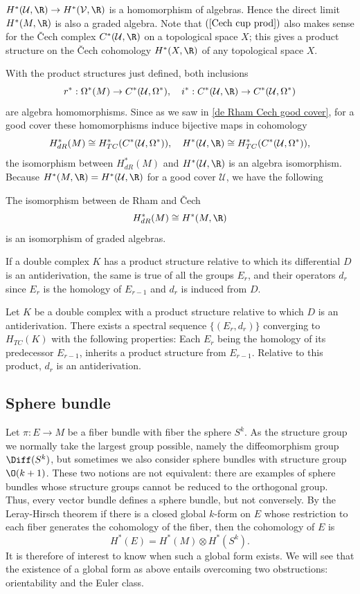 $H^*(\mathcal{U},\R)\to H^*(\mathcal{V},\R)$ is a homomorphism of algebras. Hence the direct limit $H^*(M,\R)$ is also a graded algebra. Note that $(\ref{Cech cup prod})$ 
also makes sense for the \v{C}ech complex $C^*(\mathcal{U},\R)$ on a topological space $X$; this gives a product structure on the \v{C}ech cohomology $H^*(X,\R)$ of any 
topological space $X$.\par
With the product structures just defined, both inclusions
\[r^*:\Omega^*(M)\to C^*(\mathcal{U},\Omega^*),\quad i^*:C^*(\mathcal{U},\R)\to C^*(\mathcal{U},\Omega^*)\]
are algebra homomorphisms. Since as we saw in \cref{de Rham Cech good cover}, for a good cover these homomorphisms induce bijective maps in cohomology
\[H^*_{dR}(M)\cong H^*_{TC}(C^*(\mathcal{U},\Omega^*)),\quad H^*(\mathcal{U},\R)\cong H^*_{TC}(C^*(\mathcal{U},\Omega^*)),\]
the isomorphism between $H^*_{dR}(M)$ and $H^*(\mathcal{U},\R)$ is an algebra isomorphism. Because $H^*(M,\R)=H^*(\mathcal{U},\R)$ for a good cover $\mathcal{U}$, we 
have the following
\begin{theorem}
The isomorphism between de Rham and \v{C}ech
\[H^*_{dR}(M)\cong H^*(M,\R)\]
is an isomorphism of graded algebras.
\end{theorem}
If a double complex $K$ has a product structure relative to which its differential $D$ is an antiderivation, the same is true of all the groups $E_r$, and their 
operators $d_r$ since $E_r$ is the homology of $E_{r-1}$ and $d_r$ is induced from $D$.
\begin{proposition}
Let $K$ be a double complex with a product structure relative to which $D$ is an antiderivation. There exists a spectral sequence $\{(E_r,d_r)\}$ converging to $H_{TC}(K)$ 
with the following properties: Each $E_r$ being the homology of its predecessor $E_{r-1}$, inherits a product structure from $E_{r-1}$. Relative to this product, 
$d_r$ is an antiderivation.
\end{proposition}
\subsection{Sphere bundle}
Let $\pi:E\to M$ be a fiber bundle with fiber the sphere $S^k$. As the structure group we normally take the largest group possible, namely the diffeomorphism group $\Diff(S^k)$, 
but sometimes we also consider sphere bundles with structure group $\O(k+1)$. These two notions are not equivalent: there are examples of sphere bundles whose structure 
groups cannot be reduced to the orthogonal group. Thus, every vector bundle defines a sphere bundle, but not conversely. By the Leray-Hirsch theorem if there is a closed 
global $k$-form on $E$ whose restriction to each fiber generates the cohomology of the fiber, then the cohomology of $E$ is
\[H^*(E)=H^*(M)\otimes H^*(S^k).\]
It is therefore of interest to know when such a global form exists. We will see that the existence of a global form as above entails overcoming two obstructions: 
orientability and the Euler class.
